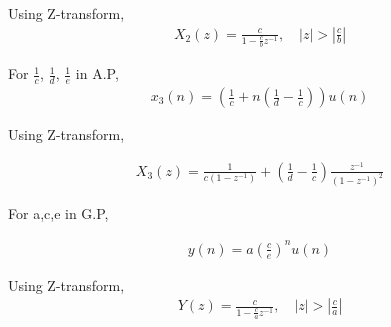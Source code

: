 \documentclass[journal,12pt,twocolumn]{IEEEtran}
\providecommand{\brak}[1]{\ensuremath{\left(#1\right)}}
\theoremstyle{remark}
\providecommand{\abs}[1]{\left\vert#1\right\vert}
\begin{document}
Using Z-transform,
\begin{align}
X_2(z) = \frac{c}{1-\frac{c}{b}z^{-1}},  \quad \abs{z}>\abs{\frac{c}{b}}
\end{align}

For $\frac{1}{c}$, $\frac{1}{d}$, $\frac{1}{e}$ in A.P,
\begin{align}
x_3(n) = \brak{\frac{1}{c} + n\brak{\frac{1}{d} - \frac{1}{c}}}u(n)
\end{align}

Using Z-transform,

\begin{align}
X_3(z) = \frac{1}{c(1-z^{-1})} + \brak{\frac{1}{d} - \frac{1}{c}}\frac{z^{-1}}{(1-z^{-1})^2}
\end{align}

For a,c,e in G.P,

\begin{align}
y(n) = a\brak{\frac{c}{e}}^n u(n)
\end{align}

Using Z-transform,
\begin{align}
Y(z) = \frac{c}{1-\frac{c}{a}z^{-1}}, \quad \abs{z}>\abs{\frac{c}{a}}
\end{align}
\end{document}

